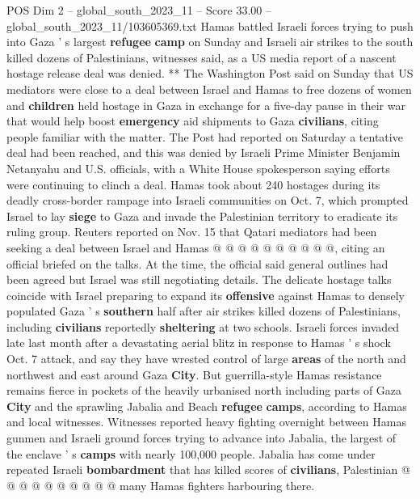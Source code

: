 \begin{textsample}{POS Dim 2 – global\_south\_2023\_11 – Score 33.00 – global\_south\_2023\_11/103605369.txt}  \label{ex:f2_pos_092}
Hamas battled Israeli forces trying to push into Gaza ' s largest \textbf{refugee} \textbf{camp} on Sunday and Israeli air strikes to the south killed dozens of Palestinians, witnesses said, as a US media report of a nascent hostage release deal was denied. ** The Washington Post said on Sunday that US mediators were close to a deal between Israel and Hamas to free dozens of women and \textbf{children} held hostage in Gaza in exchange for a five-day pause in their war that would help boost \textbf{emergency} aid shipments to Gaza \textbf{civilians}, citing people familiar with the matter.
The Post had reported on Saturday a tentative deal had been reached, and this was denied by Israeli Prime Minister Benjamin Netanyahu and U.S. officials, with a White House spokesperson saying efforts were continuing to clinch a deal.
Hamas took about 240 hostages during its deadly cross-border rampage into Israeli communities on Oct. 7, which prompted Israel to lay \textbf{siege} to Gaza and invade the Palestinian territory to eradicate its ruling group.
Reuters reported on Nov. 15 that Qatari mediators had been seeking a deal between Israel and Hamas @ @ @ @ @ @ @ @ @ @, citing an official briefed on the talks.
At the time, the official said general outlines had been agreed but Israel was still negotiating details.
The delicate hostage talks coincide with Israel preparing to expand its \textbf{offensive} against Hamas to densely populated Gaza ' s \textbf{southern} half after air strikes killed dozens of Palestinians, including \textbf{civilians} reportedly \textbf{sheltering} at two schools.
Israeli forces invaded late last month after a devastating aerial blitz in response to Hamas ' s shock Oct. 7 attack, and say they have wrested control of large \textbf{areas} of the north and northwest and east around Gaza \textbf{City}.
But guerrilla-style Hamas resistance remains fierce in pockets of the heavily urbanised north including parts of Gaza \textbf{City} and the sprawling Jabalia and Beach \textbf{refugee} \textbf{camps}, according to Hamas and local witnesses.
Witnesses reported heavy fighting overnight between Hamas gunmen and Israeli ground forces trying to advance into Jabalia, the largest of the enclave ' s \textbf{camps} with nearly 100,000 people.
Jabalia has come under repeated Israeli \textbf{bombardment} that has killed scores of \textbf{civilians}, Palestinian @ @ @ @ @ @ @ @ @ @ many Hamas fighters harbouring there.

\end{textsample}
